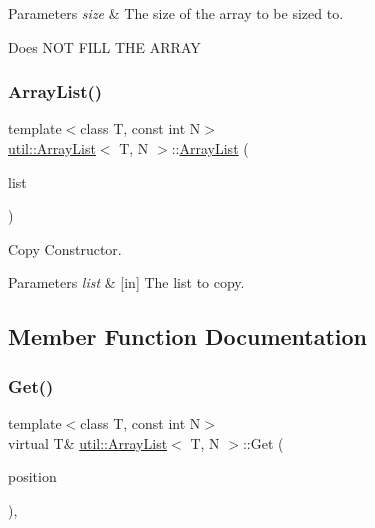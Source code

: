\begin{DoxyParams}{Parameters}
{\em size} & The size of the array to be sized to.\\
\hline
\end{DoxyParams}
Does N\+OT F\+I\+LL T\+HE A\+R\+R\+AY \mbox{\label{classutil_1_1ArrayList_ad2358386b361aa4887ac558d81f1c049}} 
\subsubsection{\texorpdfstring{Array\+List()}{ArrayList()}\hspace{0.1cm}{\footnotesize\ttfamily [3/3]}}
{\footnotesize\ttfamily template$<$class T, const int N$>$ \\
\hyperlink{classutil_1_1ArrayList}{util\+::\+Array\+List}$<$ T, N $>$\+::\hyperlink{classutil_1_1ArrayList}{Array\+List} (\begin{DoxyParamCaption}\item[{\hyperlink{classutil_1_1ArrayList}{Array\+List}$<$ T, N $>$ \&}]{list }\end{DoxyParamCaption})\hspace{0.3cm}{\ttfamily [inline]}}



Copy Constructor. 


\begin{DoxyParams}{Parameters}
{\em list} & \mbox{[}in\mbox{]} The list to copy. \\
\hline
\end{DoxyParams}


\subsection{Member Function Documentation}
\mbox{\label{classutil_1_1ArrayList_ac5a4259af59f7bac9df06851c29d9e37}} 
\subsubsection{\texorpdfstring{Get()}{Get()}}
{\footnotesize\ttfamily template$<$class T, const int N$>$ \\
virtual T\& \hyperlink{classutil_1_1ArrayList}{util\+::\+Array\+List}$<$ T, N $>$\+::Get (\begin{DoxyParamCaption}\item[{uint}]{position }\end{DoxyParamCaption})\hspace{0.3cm}{\ttfamily [inline]}, {\ttfamily [virtual]}}



